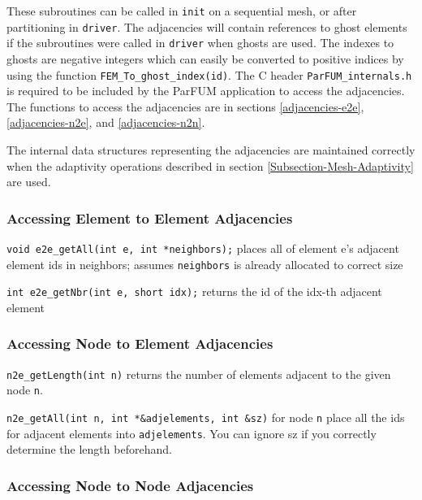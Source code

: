 These subroutines can be called in \texttt{init} on a sequential mesh, or after partitioning in \texttt{driver}. The adjacencies will contain references to ghost elements if the subroutines were called in \texttt{driver} when ghosts are used. The indexes to ghosts are negative integers which can easily be converted to positive indices by using the function \texttt{FEM\_To\_ghost\_index(id)}. The C header \texttt{ParFUM\_internals.h} is required to be included by the ParFUM application to access the adjacencies. The functions to access the adjacencies are in sections \ref{adjacencies-e2e},\ref{adjacencies-n2e}, and \ref{adjacencies-n2n}.

The internal data structures representing the adjacencies are maintained correctly when the adaptivity operations described in section \ref{Subsection-Mesh-Adaptivity} are used.

\subsubsection{Accessing Element to Element Adjacencies\label{adjacencies-e2e}}

\begin{list}{-}{}
\item \texttt{void e2e\_getAll(int e, int *neighbors);} places all of element e's adjacent element ids in neighbors; assumes \texttt{neighbors} is already allocated to correct size
\item \texttt{int e2e\_getNbr(int e, short idx);} returns the id of the idx-th adjacent element
\end{list}


\subsubsection{Accessing Node to Element Adjacencies\label{adjacencies-n2e}}

\begin{list}{-}{}
\item \texttt{n2e\_getLength(int n)} returns the number of elements adjacent to the given node \texttt{n}.
\item \texttt{n2e\_getAll(int n, int *\&adjelements, int \&sz)} for node \texttt{n} place all the ids for adjacent elements into \texttt{adjelements}. You can ignore sz if you correctly determine the length beforehand.
\end{list}


\subsubsection{Accessing Node to Node Adjacencies\label{adjacencies-n2n}}

